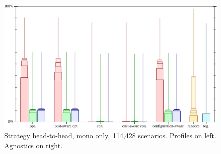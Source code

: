 \begin{figure}[t]
  \includegraphics[width=\columnwidth]{data/strategy-overall.pdf}
  \caption{Strategy head-to-head, mono only, 114,428 scenarios. Profiles on left. Agnostics on right.}
  \label{f:strategy-overall}
\end{figure}

\clearpage

